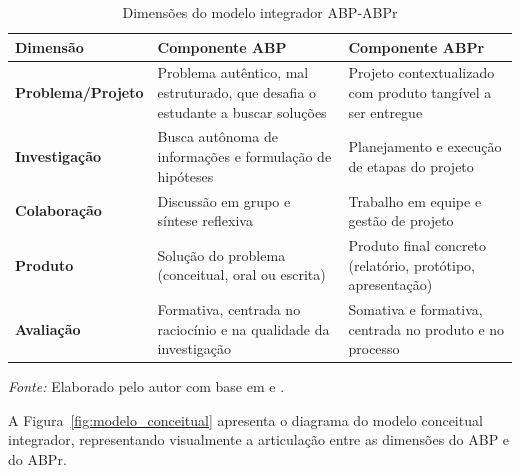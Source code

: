 \begin{table}[htbp]
    \centering
    \caption{Dimensões do modelo integrador ABP-ABPr}
    \label{tab:modelo_dimensoes}
    \small
    \begin{tabular}{p{2.8cm} p{5.2cm} p{5.2cm}}
        \toprule
        \textbf{Dimensão} & \textbf{Componente ABP} & \textbf{Componente ABPr} \\
        \midrule
        \textbf{Problema/Projeto} & Problema autêntico, mal estruturado, que desafia o estudante a buscar soluções & Projeto contextualizado com produto tangível a ser entregue \\
        \addlinespace
        \textbf{Investigação} & Busca autônoma de informações e formulação de hipóteses & Planejamento e execução de etapas do projeto \\
        \addlinespace
        \textbf{Colaboração} & Discussão em grupo e síntese reflexiva & Trabalho em equipe e gestão de projeto \\
        \addlinespace
        \textbf{Produto} & Solução do problema (conceitual, oral ou escrita) & Produto final concreto (relatório, protótipo, apresentação) \\
        \addlinespace
        \textbf{Avaliação} & Formativa, centrada no raciocínio e na qualidade da investigação & Somativa e formativa, centrada no produto e no processo \\
        \bottomrule
    \end{tabular}
    \par\medskip
    \footnotesize{\textit{Fonte:} Elaborado pelo autor com base em \cite{BARROWS1996} e \cite{BARRON1998}.}
\end{table}

A Figura~\ref{fig:modelo_conceitual} apresenta o diagrama do modelo conceitual integrador, representando visualmente a articulação entre as dimensões do ABP e do ABPr.

